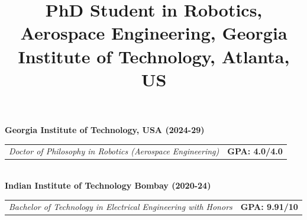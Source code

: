 \documentclass[10pt,letterpaper,sans]{moderncv}        %
\title{
\small{PhD Student in Robotics, Aerospace Engineering, Georgia Institute of Technology, Atlanta, US}}
\newcommand\x{1}
\begin{document}

\makecvhead
\vspace{-0.75cm}
\vspace{\x pt}
\vspace{-0.20 cm}
\textbf{{Georgia Institute of Technology, USA} \hfill {\textbf{(2024-29)}}}\\
\begin{tabular}{p{} r}
     \textit{Doctor of Philosophy in Robotics (Aerospace Engineering)
} & \textbf{GPA: 4.0/4.0}\\
    
\end{tabular}\\
\textbf{{Indian Institute of Technology Bombay} \hfill {\textbf{(2020-24)}}}\\
\begin{tabular}{p{} r}
     \textit{Bachelor of Technology in Electrical Engineering with Honors} &  \textbf{GPA: 9.91/10}\\
    
\end{tabular}
\\
\end{document}
